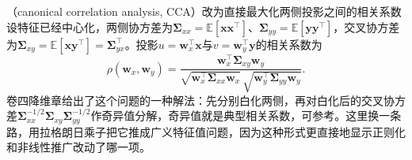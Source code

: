 （canonical correlation analysis, CCA）改为直接最大化两侧投影之间的相关系数设特征已经中心化，两侧协方差为$\bm\Sigma_{xx}=\mathbb E[\bm x\bm x^\top]$、$\bm\Sigma_{yy}=\mathbb E[\bm y\bm y^\top]$，交叉协方差为$\bm\Sigma_{xy}=\mathbb E[\bm x\bm y^\top]=\bm\Sigma_{yx}^\top$。投影$u=\bm w_x^\top\bm x$与$v=\bm w_y^\top\bm y$的相关系数为
\begin{equation}
  \rho(\bm w_x,\bm w_y)=
  \frac{\bm w_x^\top\bm\Sigma_{xy}\bm w_y}
       {\sqrt{\bm w_x^\top\bm\Sigma_{xx}\bm w_x}\,
        \sqrt{\bm w_y^\top\bm\Sigma_{yy}\bm w_y}}.
  \label{eq:vision-alignment-cca-objective}
\end{equation}
卷四降维章给出了这个问题的一种解法：先分别白化两侧，再对白化后的交叉协方差$\bm\Sigma_{xx}^{-1/2}\bm\Sigma_{xy}\bm\Sigma_{yy}^{-1/2}$作奇异值分解，奇异值就是典型相关系数，可参考。这里换一条路，用拉格朗日乘子把它推成广义特征值问题，因为这种形式更直接地显示正则化和非线性推广改动了哪一项。


